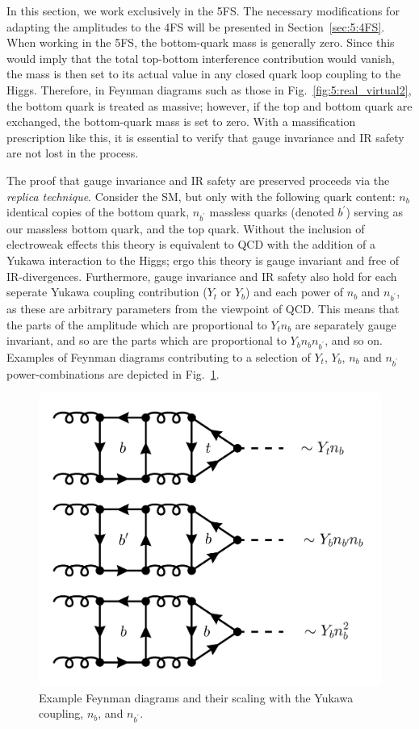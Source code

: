 In this section, we work exclusively in the 5\acs{FS}. The necessary modifications for adapting the amplitudes to the 4\acs{FS} will be presented in Section~\ref{sec:5:4FS}. When working in the 5\acs{FS}, the bottom-quark mass is generally zero. Since this would imply that the total top-bottom interference contribution would vanish, the mass is then set to its actual value in any closed quark loop coupling to the Higgs. Therefore, in Feynman diagrams such as those in Fig.~\ref{fig:5:real_virtual2}, the bottom quark is treated as massive; however, if the top and bottom quark are exchanged, the bottom-quark mass is set to zero. With a massification prescription like this, it is essential to verify that gauge invariance and \acs{IR} safety are not lost in the process.

The proof that gauge invariance and \acs{IR} safety are preserved proceeds via the \textit{replica technique}. Consider the \acs{SM}, but only with the following quark content: $n_b$ identical copies of the bottom quark, $n_{b^\prime}$ massless quarks (denoted $b^\prime$) serving as our massless bottom quark, and the top quark. Without the inclusion of electroweak effects this theory is equivalent to \acs{QCD} with the addition of a Yukawa interaction to the Higgs; ergo this theory is gauge invariant and free of \acs{IR}-divergences. Furthermore, gauge invariance and \acs{IR} safety also hold for each seperate Yukawa coupling contribution ($Y_t$ or $Y_b$) and each power of $n_b$ and $n_{b^\prime}$, as these are arbitrary parameters from the viewpoint of \acs{QCD}. This means that the parts of the amplitude which are proportional to $Y_t n_b$ are separately gauge invariant, and so are the parts which are proportional to $Y_b n_b n_{b^\prime}$, and so on. Examples of Feynman diagrams contributing to a selection of $Y_t$, $Y_b$, $n_b$ and $n_{b^\prime}$ power-combinations are depicted in Fig.~\ref{fig:5:replica}.
\begin{figure}[h]
\centering
\includegraphics[scale=0.25]{Images/NNLO_Feynman_diagrams/replica.pdf}
\caption{Example Feynman diagrams and their scaling with the Yukawa coupling, $n_b$, and $n_{b^\prime}$.}
\label{fig:5:replica}
\end{figure}

